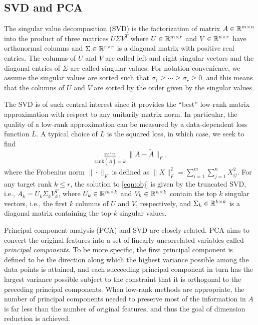 \subsection{SVD and PCA}

The singular value decomposition (SVD) is the factorization of matrix $A \in \mathbb{R}^{m\times n}$ into the product of three matrices $U\Sigma V^T$ where $U \in \mathbb{R}^{m\times r}$ and $V\in \mathbb{R}^{n\times r}$ have orthonormal columns and $\Sigma\in \mathbb{R}^{r\times r}$ is a diagonal matrix with positive real entries. 
The columns of $U$ and $V$ are called left and right singular vectors and the diagonal entries of $\Sigma$ are called singular values. 
For notation convenience, we assume the singular values are sorted such that $\sigma_1\geq \cdots \geq \sigma_r\geq 0$, and this means that the columns of $U$ and $V$ are sorted by the order given by the singular values.  

 
The SVD is of such central interest since it provides the ``best'' low-rank matrix approximation with respect to any unitarily matrix norm.
In particular, the quality of  a low-rank approximation can be measured by a data-dependent loss function $L$. 
A typical choice of $L$ is the squared loss, in which case, we seek to find
\begin{equation}
 \label{eqn:obj}
  \min_{\text{rank}(\tilde A) = k} \| A - \tilde A \|_F,
\end{equation}
where the Frobenius norm $\| \cdot \|_F$ is defined as $\|X\|_F^2 = \sum_{i=1}^m \sum_{j=1}^n X_{ij}^2 $.
For any target rank $k\leq r$, the solution to \eqref{eqn:obj} is given by the truncated SVD, i.e., $A_k = U_k \Sigma_k V_k^T$, where $U_k \in \mathbb{R}^{m\times k}$ and $V_k\in \mathbb{R}^{n\times k}$ contain the top $k$ singular vectors, i.e., the first $k$ columns of $U$ and $V$, respectively, and $\Sigma_k\in \mathbb{R}^{k\times k}$ is a diagonal matrix containing the top-$k$ singular values.

Principal component analysis (PCA) and SVD are closely related.
PCA aims to convert the original features into a set of linearly uncorrelated variables called {\it principal components}.
To be more specific, the first principal component is defined to be the direction along which the highest variance possible among the data points is attained, and each succeeding principal component in turn has the largest variance possible subject to the constraint that it is orthogonal to the preceding principal components.
When low-rank methods are appropriate, the number of principal components needed to preserve most of the information in $A$ is far less than the number of original features, and thus the goal of dimension reduction is achieved.

